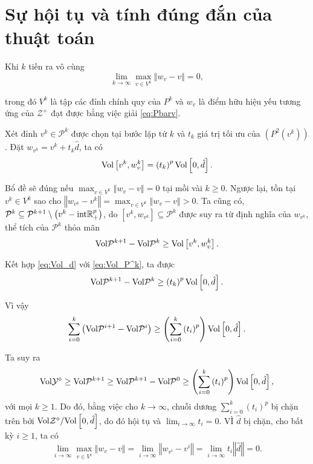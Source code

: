 \section{Sự hội tụ và tính đúng đắn của thuật toán}
\begin{bd}\label{lem-max_norm} Khi $k$ tiến ra vô cùng
\[
\lim_{k\rightarrow\infty}\max_{v\in V^{k}}\left\Vert w_{v}-v\right\Vert =0,
\]

trong đó $V^{k}$ là tập các đỉnh chính quy của $P^{k}$
và $w_{v}$ là điểm hữu hiệu yếu tương ứng của $\mathcal{Z}^{+}$
đạt được bằng việc giải \ref{eq:Pbarv}.

\end{bd}

\begin{cm} Xét đỉnh $v^{k}\in\mathcal{P}^{k}$ được chọn tại bước lặp tứ $k$ và $t_{k}$ giá trị tối ưu của $\left(P^{2}\left(v^{k}\right)\right)$.
Đặt $w_{v^{k}}=v^{k}+t_{k}\hat{d}$, ta có
\begin{equation}
{\rm {\rm Vol}}\left[v^{k},w_{v}^{k}\right]=\left(t_{k}\right)^{p}{\rm Vol}\left[0,\hat{d}\right].\label{eq:Vol_d}
\end{equation}

Bổ đề sẽ đúng nếu $\max_{v\in V^{k}}\left\Vert w_{v}-v\right\Vert =0$
tại mồi vài $k\ge0$. Ngược lại, tồn tại $v^{k}\in V^{k}$ sao cho
$\left\Vert w_{v^{k}}-v^{k}\right\Vert =\max_{v\in V^{k}}\left\Vert w_{v}-v\right\Vert >0$.
Ta cũng có, $\mathcal{P}^{k}\subseteq\mathcal{P}^{k+1}\setminus\left(v^{k}-{\rm int}\mathbb{R}_{+}^{p}\right)$,
do $\left[v^{k},w_{v^{k}}\right]\subseteq\mathcal{P}^{k}$ được suy ra từ định nghĩa của $w_{v^{k}}$, thể tích của $\mathcal{P}^{k}$
thỏa mãn
\begin{equation}
{\rm Vol}\mathcal{P}^{k+1}-{\rm Vol}\mathcal{P}^{k}\ge{\rm Vol}\left[v^{k},w_{v}^{k}\right].\label{eq:Vol_P^k}
\end{equation}

Kết hợp \ref{eq:Vol_d} với \ref{eq:Vol_P^k}, ta được
\[
{\rm Vol}\mathcal{P}^{k+1}-{\rm Vol}\mathcal{P}^{k}\ge\left(t_{k}\right)^{p}{\rm Vol}\left[0,\hat{d}\right].
\]

Vì vậy
\[
\sum_{i=0}^{k}\left({\rm Vol}\mathcal{P}^{i+1}-{\rm Vol}\mathcal{P}^{i}\right)\ge\left(\sum_{i=0}^{k}\left(t_{i}\right)^{p}\right){\rm Vol}\left[0,\hat{d}\right].
\]

Ta suy ra
\[
{\rm Vol}\mathcal{Y}^{\diamond}\ge{\rm Vol}\mathcal{P}^{k+1}\ge{\rm Vol}\mathcal{P}^{k+1}-{\rm Vol}\mathcal{P}^{0}\ge\left(\sum_{i=0}^{k}\left(t_{i}\right)^{p}\right){\rm Vol}\left[0,\hat{d}\right],
\]
với mọi $k\ge1$. Do đó, bằng việc cho $k\rightarrow\infty$, chuỗi dương $\sum_{i=0}^{k}\left(t_{i}\right)^{p}$ bị chặn trên bởi
${\rm Vol}\mathcal{Z}^{\diamond}/{\rm Vol}\left[0,\hat{d}\right]$,
do đó hội tụ và $\lim_{i\rightarrow\infty}t_{i}=0$.
VÌ $\hat{d}$ bị chặn, cho bất kỳ $i\ge1$, ta có
\[
\lim_{i\rightarrow\infty}\max_{v\in V^{i}}\left\Vert w_{v}-v\right\Vert =\lim_{i\rightarrow\infty}\left\Vert w_{v^{i}}-v^{i}\right\Vert =\lim_{i\rightarrow\infty}t_{i}\left\Vert \hat{d}\right\Vert =0.
\]
\end{cm}

